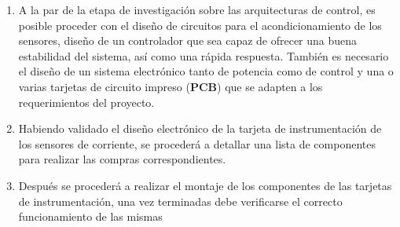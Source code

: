 \begin{enumerate}
   
 
  
 

\item A la par de la etapa de investigación sobre las arquitecturas de control, es posible proceder con el diseño de circuitos para el acondicionamiento de los sensores, diseño de un controlador que sea capaz de ofrecer una buena estabilidad del sistema, así como una rápida respuesta. También es necesario el diseño de un sistema electrónico tanto de potencia como de control y una o varias tarjetas de circuito impreso (\textbf{PCB}) que se adapten a los requerimientos del proyecto. 

\item Habiendo validado el diseño electrónico de la tarjeta de instrumentación de los sensores de corriente, se procederá a detallar una lista de componentes para realizar las compras correspondientes.  

\item Después se procederá a realizar el montaje de los componentes de las tarjetas de instrumentación, una vez terminadas debe verificarse el correcto funcionamiento de las mismas








\end{enumerate}
